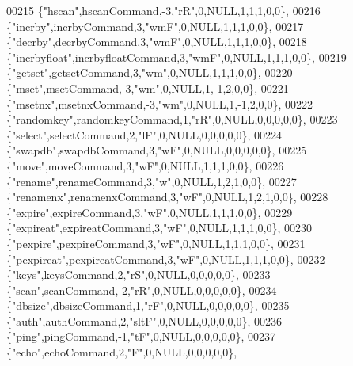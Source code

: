 \begin{DoxyCode}
00215     \{\textcolor{stringliteral}{"hscan"},hscanCommand,-3,\textcolor{stringliteral}{"rR"},0,NULL,1,1,1,0,0\},
00216     \{\textcolor{stringliteral}{"incrby"},incrbyCommand,3,\textcolor{stringliteral}{"wmF"},0,NULL,1,1,1,0,0\},
00217     \{\textcolor{stringliteral}{"decrby"},decrbyCommand,3,\textcolor{stringliteral}{"wmF"},0,NULL,1,1,1,0,0\},
00218     \{\textcolor{stringliteral}{"incrbyfloat"},incrbyfloatCommand,3,\textcolor{stringliteral}{"wmF"},0,NULL,1,1,1,0,0\},
00219     \{\textcolor{stringliteral}{"getset"},getsetCommand,3,\textcolor{stringliteral}{"wm"},0,NULL,1,1,1,0,0\},
00220     \{\textcolor{stringliteral}{"mset"},msetCommand,-3,\textcolor{stringliteral}{"wm"},0,NULL,1,-1,2,0,0\},
00221     \{\textcolor{stringliteral}{"msetnx"},msetnxCommand,-3,\textcolor{stringliteral}{"wm"},0,NULL,1,-1,2,0,0\},
00222     \{\textcolor{stringliteral}{"randomkey"},randomkeyCommand,1,\textcolor{stringliteral}{"rR"},0,NULL,0,0,0,0,0\},
00223     \{\textcolor{stringliteral}{"select"},selectCommand,2,\textcolor{stringliteral}{"lF"},0,NULL,0,0,0,0,0\},
00224     \{\textcolor{stringliteral}{"swapdb"},swapdbCommand,3,\textcolor{stringliteral}{"wF"},0,NULL,0,0,0,0,0\},
00225     \{\textcolor{stringliteral}{"move"},moveCommand,3,\textcolor{stringliteral}{"wF"},0,NULL,1,1,1,0,0\},
00226     \{\textcolor{stringliteral}{"rename"},renameCommand,3,\textcolor{stringliteral}{"w"},0,NULL,1,2,1,0,0\},
00227     \{\textcolor{stringliteral}{"renamenx"},renamenxCommand,3,\textcolor{stringliteral}{"wF"},0,NULL,1,2,1,0,0\},
00228     \{\textcolor{stringliteral}{"expire"},expireCommand,3,\textcolor{stringliteral}{"wF"},0,NULL,1,1,1,0,0\},
00229     \{\textcolor{stringliteral}{"expireat"},expireatCommand,3,\textcolor{stringliteral}{"wF"},0,NULL,1,1,1,0,0\},
00230     \{\textcolor{stringliteral}{"pexpire"},pexpireCommand,3,\textcolor{stringliteral}{"wF"},0,NULL,1,1,1,0,0\},
00231     \{\textcolor{stringliteral}{"pexpireat"},pexpireatCommand,3,\textcolor{stringliteral}{"wF"},0,NULL,1,1,1,0,0\},
00232     \{\textcolor{stringliteral}{"keys"},keysCommand,2,\textcolor{stringliteral}{"rS"},0,NULL,0,0,0,0,0\},
00233     \{\textcolor{stringliteral}{"scan"},scanCommand,-2,\textcolor{stringliteral}{"rR"},0,NULL,0,0,0,0,0\},
00234     \{\textcolor{stringliteral}{"dbsize"},dbsizeCommand,1,\textcolor{stringliteral}{"rF"},0,NULL,0,0,0,0,0\},
00235     \{\textcolor{stringliteral}{"auth"},authCommand,2,\textcolor{stringliteral}{"sltF"},0,NULL,0,0,0,0,0\},
00236     \{\textcolor{stringliteral}{"ping"},pingCommand,-1,\textcolor{stringliteral}{"tF"},0,NULL,0,0,0,0,0\},
00237     \{\textcolor{stringliteral}{"echo"},echoCommand,2,\textcolor{stringliteral}{"F"},0,NULL,0,0,0,0,0\},

\end{DoxyCode}

